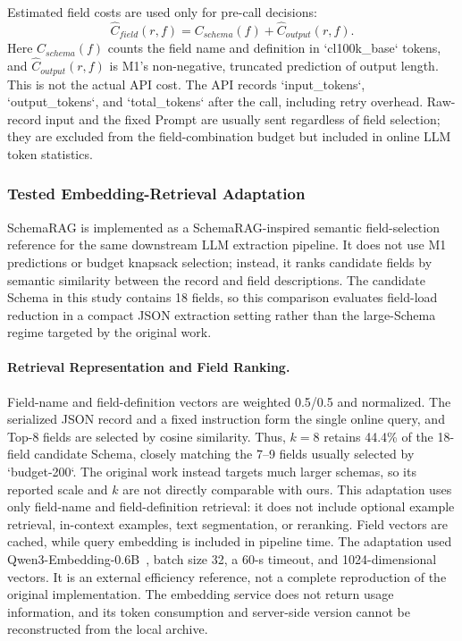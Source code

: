 \documentclass[runningheads]{llncs}
\newcommand{\method}{M1}
\newcommand{\schemarag}{SchemaRAG}
\begin{document}
Estimated field costs are used only for pre-call decisions:
\begin{equation}
 \widehat{C}_{field}(r,f)=C_{schema}(f)+\widehat{C}_{output}(r,f).
\end{equation}
Here $C_{schema}(f)$ counts the field name and definition in `cl100k_base` tokens, and $\widehat{C}_{output}(r,f)$ is \method{}'s non-negative, truncated prediction of output length. This is not the actual API cost. The API records `input_tokens`, `output_tokens`, and `total_tokens` after the call, including retry overhead. Raw-record input and the fixed Prompt are usually sent regardless of field selection; they are excluded from the field-combination budget but included in online LLM token statistics.

\subsubsection{Tested Embedding-Retrieval Adaptation}

\schemarag{} is implemented as a SchemaRAG-inspired semantic field-selection reference for the same downstream LLM extraction pipeline. It does not use \method{} predictions or budget knapsack selection; instead, it ranks candidate fields by semantic similarity between the record and field descriptions. The candidate Schema in this study contains 18 fields, so this comparison evaluates field-load reduction in a compact JSON extraction setting rather than the large-Schema regime targeted by the original work.

\paragraph{Retrieval Representation and Field Ranking.}

Field-name and field-definition vectors are weighted 0.5/0.5 and normalized. The serialized JSON record and a fixed instruction form the single online query, and Top-8 fields are selected by cosine similarity. Thus, $k=8$ retains 44.4\% of the 18-field candidate Schema, closely matching the 7--9 fields usually selected by `budget-200`. The original work instead targets much larger schemas, so its reported scale and $k$ are not directly comparable with ours. This adaptation uses only field-name and field-definition retrieval: it does not include optional example retrieval, in-context examples, text segmentation, or reranking. Field vectors are cached, while query embedding is included in pipeline time. The adaptation used Qwen3-Embedding-0.6B~\cite{zhang2025qwen3embedding}, batch size 32, a 60-s timeout, and 1024-dimensional vectors. It is an external efficiency reference, not a complete reproduction of the original implementation. The embedding service does not return usage information, and its token consumption and server-side version cannot be reconstructed from the local archive.
\end{document}
